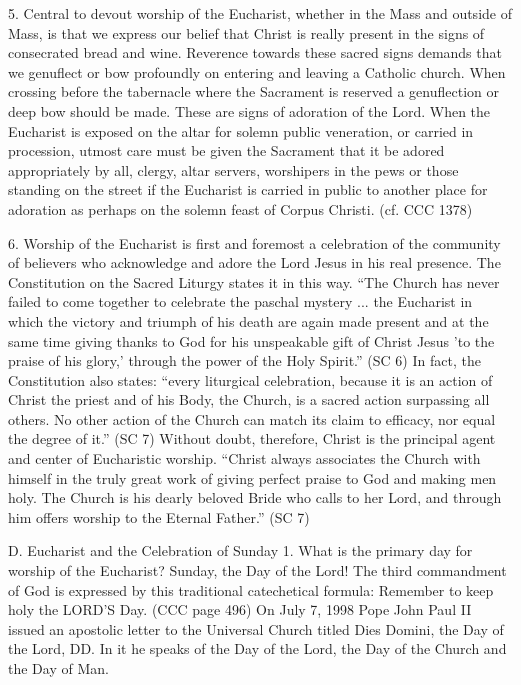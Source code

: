 \documentclass[oneside]{book}
\begin{document}
5. Central to devout worship of the Eucharist, whether in the Mass and outside
of Mass, is that we express our belief that Christ is really present in the
signs of consecrated bread and wine. Reverence towards these sacred signs
demands that we genuflect or bow profoundly on entering and leaving a Catholic
church. When crossing before the tabernacle where the Sacrament is reserved a
genuflection or deep bow should be made. These are signs of adoration of the
Lord. When the Eucharist is exposed on the altar for solemn public veneration,
or carried in procession, utmost care must be given the Sacrament that it be
adored appropriately by all, clergy, altar servers, worshipers in the pews or
those standing on the street if the Eucharist is carried in public to another
place for adoration as perhaps on the solemn feast of Corpus Christi. (cf. CCC
1378)

6. Worship of the Eucharist is first and foremost a celebration of the community
of believers who acknowledge and adore the Lord Jesus in his real presence. The
Constitution on the Sacred Liturgy states it in this way. ``The Church has never
failed to come together to celebrate the paschal mystery ... the Eucharist in
which the victory and triumph of his death are again made present and at the
same time giving thanks to God for his unspeakable gift of Christ Jesus 'to the
praise of his glory,' through the power of the Holy Spirit.'' (SC 6) In fact,
the Constitution also states: ``every liturgical celebration, because it is an
action of Christ the priest and of his Body, the Church, is a sacred action
surpassing all others. No other action of the Church can match its claim to
efficacy, nor equal the degree of it.'' (SC 7) Without doubt, therefore, Christ
is the principal agent and center of Eucharistic worship. ``Christ always
associates the Church with himself in the truly great work of giving perfect
praise to God and making men holy. The Church is his dearly beloved Bride who
calls to her Lord, and through him offers worship to the Eternal Father.'' (SC 7)

D. Eucharist and the Celebration of Sunday
1. What is the primary day for worship of the Eucharist? Sunday, the Day of the
Lord! The third commandment of God is expressed by this traditional catechetical
formula: Remember to keep holy the LORD'S Day. (CCC page 496) On July 7, 1998
Pope John Paul II issued an apostolic letter to the Universal Church titled Dies
Domini, the Day of the Lord, DD. In it he speaks of the Day of the Lord, the Day
of the Church and the Day of Man.
\end{document}
